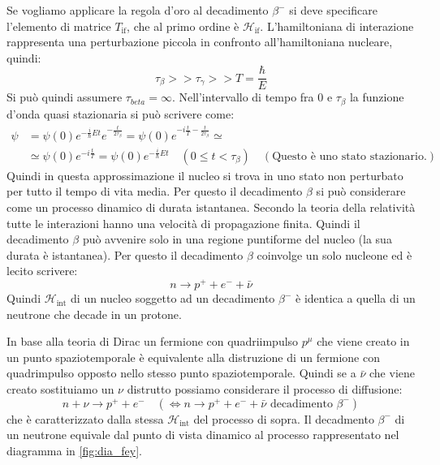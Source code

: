 Se vogliamo applicare la regola d'oro al decadimento $\beta^-$ si deve specificare l'elemento di matrice $T_{\text{if}}$, che al primo ordine è $\mathcal{H}_{\text{if}}$.
L'hamiltoniana di interazione rappresenta una perturbazione piccola in confronto all'hamiltoniana nucleare, quindi:
\[
\tau_{\beta}>>\tau_{\gamma}>>T=\frac{\hbar}{E}
\]
Si può quindi assumere $\tau_{beta}=\infty$. Nell'intervallo di tempo fra $0$ e $\tau_{\beta}$ la funzione d'onda quasi stazionaria si può scrivere come:
\[
\begin{split}
\psi &=\psi(0)e^{-\frac{i}{\hbar}Et}e^{-\frac{t}{2\tau_{\beta}}}=\psi(0)e^{-i\frac{t}{T}-\frac{t}{2\tau_{\beta}}}\simeq\\
&\simeq\psi(0)e^{-i\frac{t}{T}}=\psi(0)e^{-\frac{i}{\hbar}Et}\quad(0\leq t<\tau_{\beta})\quad(\text{Questo è uno stato stazionario.})
\end{split}
\]
Quindi in questa approssimazione il nucleo si trova in uno stato non perturbato per tutto il tempo di vita media. Per questo il decadimento $\beta$ si può considerare
come un processo dinamico di durata istantanea. Secondo la teoria della relatività tutte le interazioni hanno una velocità di propagazione finita. Quindi il decadimento $\beta$
può avvenire solo in una regione puntiforme del nucleo (la sua durata è istantanea).
Per questo il decadimento $\beta$ coinvolge un solo nucleone ed è lecito scrivere:
\[
n\rightarrow p^++e^-+\bar{\nu}
\]
Quindi $\mathcal{H}_{\text{int}}$ di un nucleo soggetto ad un decadimento $\beta^-$ è identica a quella di un neutrone che decade in un protone.
\breaknote

In base alla teoria di Dirac un fermione con quadriimpulso $p^{\mu}$ che viene creato in un punto spaziotemporale è equivalente alla distruzione di
un fermione con quadrimpulso opposto nello stesso punto spaziotemporale. Quindi se a $\bar{\nu}$ che viene creato sostituiamo un $\nu$ distrutto possiamo considerare
il processo di diffusione:
\[
n+\nu\rightarrow p^++e^-\quad(\Leftrightarrow n\rightarrow p^++e^-+\bar{\nu} \text{ decadimento $\beta^-$})
\]
che è caratterizzato dalla stessa $\mathcal{H}_{\text{int}}$ del processo di sopra. Il decadmento $\beta^-$ di un neutrone equivale dal punto di vista dinamico al processo rappresentato nel
diagramma in \autoref{fig:dia_fey}.
\begin{figure}
\centering
\caption{}
\label{fig:dia_fey}
\end{figure}

